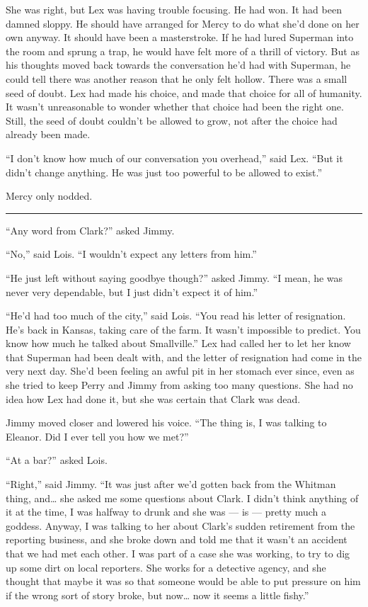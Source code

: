 She was right, but Lex was having trouble focusing. He had won. It had
been damned sloppy. He should have arranged for Mercy to do what she'd
done on her own anyway. It should have been a masterstroke. If he had
lured Superman into the room and sprung a trap, he would have felt more
of a thrill of victory. But as his thoughts moved back towards the
conversation he'd had with Superman, he could tell there was another
reason that he only felt hollow. There was a small seed of doubt. Lex
had made his choice, and made that choice for all of humanity. It wasn't
unreasonable to wonder whether that choice had been the right one.
Still, the seed of doubt couldn't be allowed to grow, not after the
choice had already been made.

``I don't know how much of our conversation you overhead,'' said Lex.
``But it didn't change anything. He was just too powerful to be allowed
to exist.''

Mercy only nodded.

\begin{center}\rule{0.5\linewidth}{0.5pt}\end{center}

``Any word from Clark?'' asked Jimmy.

``No,'' said Lois. ``I wouldn't expect any letters from him.''

``He just left without saying goodbye though?'' asked Jimmy. ``I mean,
he was never very dependable, but I just didn't expect it of him.''

``He'd had too much of the city,'' said Lois. ``You read his letter of
resignation. He's back in Kansas, taking care of the farm. It wasn't
impossible to predict. You know how much he talked about Smallville.''
Lex had called her to let her know that Superman had been dealt with,
and the letter of resignation had come in the very next day. She'd been
feeling an awful pit in her stomach ever since, even as she tried to
keep Perry and Jimmy from asking too many questions. She had no idea how
Lex had done it, but she was certain that Clark was dead.

Jimmy moved closer and lowered his voice. ``The thing is, I was talking
to Eleanor. Did I ever tell you how we met?''

``At a bar?'' asked Lois.

``Right,'' said Jimmy. ``It was just after we'd gotten back from the
Whitman thing, and\ldots{} she asked me some questions about Clark. I
didn't think anything of it at the time, I was halfway to drunk and she
was --- is --- pretty much a goddess. Anyway, I was talking to her about
Clark's sudden retirement from the reporting business, and she broke
down and told me that it wasn't an accident that we had met each other.
I was part of a case she was working, to try to dig up some dirt on
local reporters. She works for a detective agency, and she thought that
maybe it was so that someone would be able to put pressure on him if the
wrong sort of story broke, but now\ldots{} now it seems a little
fishy.''

